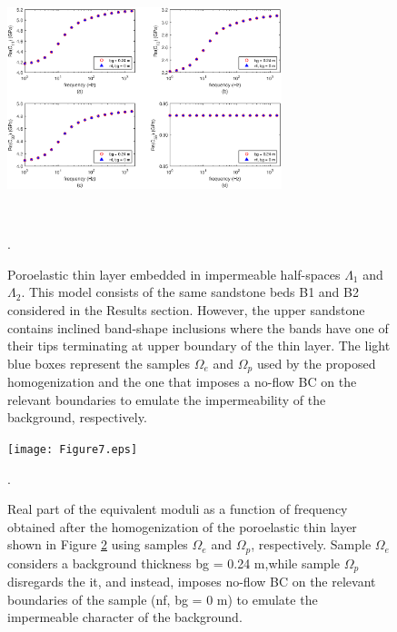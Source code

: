 \documentclass[draft]{agujournal2019}
\begin{document}
\begin{figure}[!ht]
\centering
        \includegraphics[width= 80mm, height=70mm]{Figure6.eps}
\caption{Poroelastic thin layer embedded in impermeable half-spaces $\Lambda_1$ and $\Lambda_2$. This model consists of the same sandstone beds B1 and B2 considered in the Results section. However, the upper sandstone contains inclined band-shape inclusions where the bands have one of their tips terminating at upper boundary of the thin layer. The light blue boxes represent the samples $\Omega_e$ and $\Omega_p$ used by the proposed homogenization and the one that imposes a no-flow BC on the relevant boundaries to emulate the impermeability of the background, respectively.}. 
\label{fig.6}
\end{figure}

\begin{figure}[!ht]
\centering
        \texttt{[image: Figure7.eps]}
\caption{Real part of the equivalent moduli as a function of frequency obtained after the homogenization of the poroelastic thin layer shown in Figure \ref{fig.7} using samples $\Omega_e$ and  $\Omega_p$, respectively. Sample $\Omega_e$ considers a background thickness bg = 0.24 m,while sample $\Omega_p$ disregards the it, and instead, imposes no-flow BC on the relevant boundaries of the sample (nf, bg = 0 m) to emulate the impermeable character of the background.}. 

\label{fig.7}
\end{figure}
\end{document}
